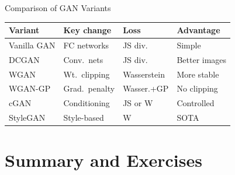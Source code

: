 \documentclass[aspectratio=169,11pt]{beamer}
\begin{document}
\begin{frame}{Comparison of GAN Variants}
  \begin{center}
  \small
  \renewcommand{\arraystretch}{1.2}
  \begin{tabular}{p{2.0cm}p{2.8cm}p{2.3cm}p{2.6cm}}
    \toprule
    \textbf{Variant} & \textbf{Key change} & \textbf{Loss} & \textbf{Advantage}\\
    \midrule
    Vanilla GAN & FC networks   & JS div.       & Simple\\
    DCGAN       & Conv.\ nets   & JS div.       & Better images\\
    WGAN        & Wt.\ clipping & Wasserstein   & More stable\\
    WGAN-GP     & Grad.\ penalty& Wasser.+GP    & No clipping\\
    cGAN        & Conditioning  & JS or W       & Controlled\\
    StyleGAN    & Style-based   & W             & SOTA\\
    \bottomrule
  \end{tabular}
  \end{center}
\end{frame}


\section{Summary and Exercises}
\end{document}
